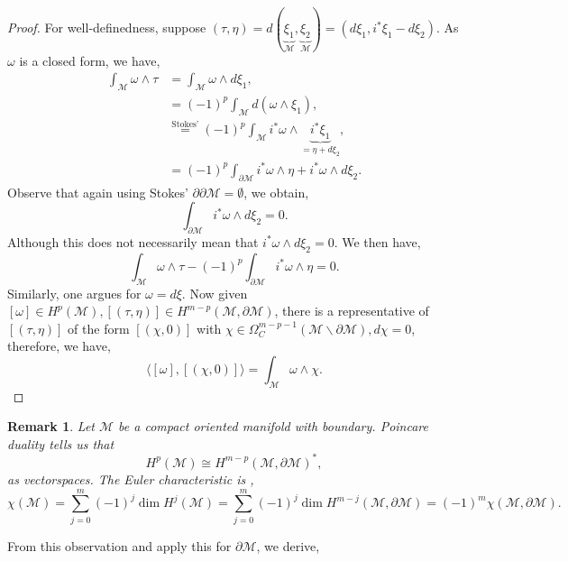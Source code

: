\documentclass[8pt]{article}
\newtheorem{remark}{Remark}[section]
\newcommand{\M}[0]{\mathcal{M}}
\begin{document}
\begin{proof}
  For well-definedness, suppose $(\tau,\eta)=d(\underbrace{\xi_1}_{\M},\underbrace{\xi_2}_{\M})=(d\xi_1,i^*\xi_1-d\xi_2)$.
  As $\omega$ is a closed form, we have,
  \begin{align*}
    \int_{\M}\omega\wedge\tau & = \int_\M\omega\wedge d\xi_1,\\
    &=(-1)^p\int_\M d(\omega\wedge\xi_1),\\
    &\stackrel{\text{Stokes'}}{=}(-1)^p\int_\M i^*\omega\wedge\underbrace{i^*\xi_1}_{=\eta+d\xi_2},\\
    & = (-1)^p\int_{\partial\M}i^*\omega\wedge\eta+i^*\omega\wedge d\xi_2.
  \end{align*}
  Observe that again using Stokes' $\partial\partial\M=\emptyset$, we obtain,
  \begin{equation*}
    \int_{\partial\M}i^*\omega\wedge d\xi_2=0.
  \end{equation*}
  Although this does not necessarily mean that $i^*\omega\wedge d\xi_2=0$. We then have,
  \begin{equation*}
    \int_\M\omega\wedge\tau - (-1)^p\int_{\partial\M}i^*\omega\wedge\eta=0.
  \end{equation*}
  Similarly, one argues for $\omega=d\xi$. Now given $[\omega]\in H^p(\M),[(\tau,\eta)]\in H^{m-p}(\M,\partial\M)$, there is a representative of $[(\tau,\eta)]$ of the form $[(\chi,0)]$ with $\chi\in\Omega_C^{m-p-1}(\M\backslash\partial\M), d\chi=0$,
  therefore, we have,
  \begin{equation*}
    \langle[\omega],[(\chi,0)]\rangle = \int_\M\omega\wedge\chi.
  \end{equation*}
\end{proof}
\begin{remark}
  Let $\M$ be a compact oriented manifold with boundary. Poincare duality tells us that 
  \begin{equation*}
    H^p(\M)\cong H^{m-p}(\M,\partial\M)^*,
  \end{equation*}
  as vectorspaces. The Euler characteristic is ,
  \begin{equation*}
    \chi(\M)=\sum_{j=0}^m(-1)^j\dim H^j(\M)=\sum_{j=0}^m(-1)^j\dim H^{m-j}(\M,\partial\M)=(-1)^m\chi(\M,\partial\M).
  \end{equation*}
\end{remark}
From this observation and apply this for $\partial\M$, we derive,
\end{document}
